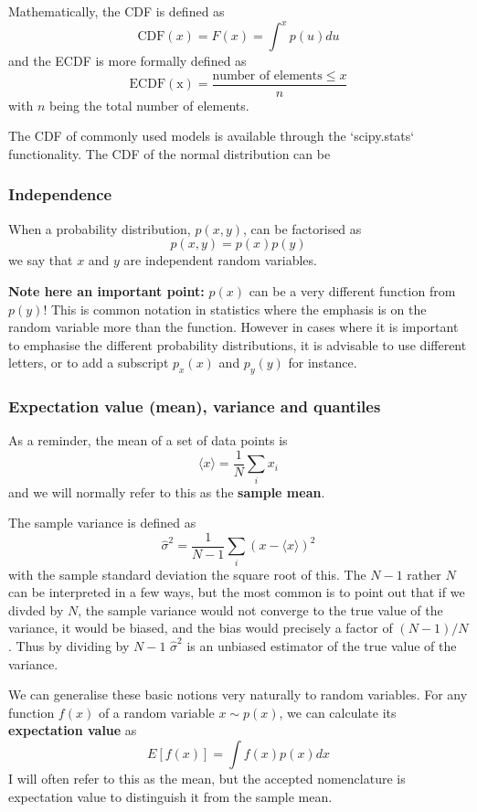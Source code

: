 \documentclass[a4paper,10pt]{article}
\begin{document}
Mathematically, the CDF is defined as
$$\mathrm{CDF}(x) = F(x) = \int^x p(u) du$$
and the ECDF is more formally defined as
$$\mathrm{ECDF(x)} = \frac{\mbox{number of elements}\le x}{n}$$
with $n$ being the total number of elements.

The CDF of commonly used models is available through the `scipy.stats` functionality. The CDF of the normal distribution can be 



\subsubsection{ Independence}

When a probability distribution, $p(x, y)$, can be factorised as
$$p(x, y) = p(x) p(y)$$ we say that $x$ and $y$ are independent random variables.

\textbf{Note here an important point:} $p(x)$ can be a very different function from $p(y)$! This is common notation in statistics where the emphasis is on the random variable more than the function. However in cases where it is important to emphasise the different probability distributions, it is advisable to use different letters, or to add a subscript $p_x(x)$ and $p_y(y)$ for instance.

\subsubsection{ Expectation value (mean), variance and quantiles}

As a reminder, the mean of a set of data points is $$\langle x \rangle = \frac{1}{N} \sum_i x_i $$ and we will normally refer to this as the \textbf{sample mean}.

The sample variance is defined as
$$\hat{\sigma}^2 = \frac{1}{N-1} \sum_i \left(x-\langle x \rangle\right)^2$$
with the sample standard deviation the square root of this. The $N-1$ rather $N$ can be interpreted in a few ways, but the most common is to point out that if we divded by $N$, the sample variance would not converge to the true value of the variance, it would be biased, and the bias would precisely a factor of $(N-1)/N$. Thus by dividing by $N-1$  $\hat{\sigma}^2$ is an unbiased estimator of the true value of the variance.

We can generalise these basic notions very naturally to random variables. 
For any function $f(x)$ of a random variable $x\sim p(x)$, we can calculate its \textbf{expectation value} as 
$$E\left[f(x)\right] = \int f(x) p(x) dx$$
I will often refer to this as the mean, but the accepted nomenclature is expectation value to distinguish it from the sample mean. 
\end{document}
